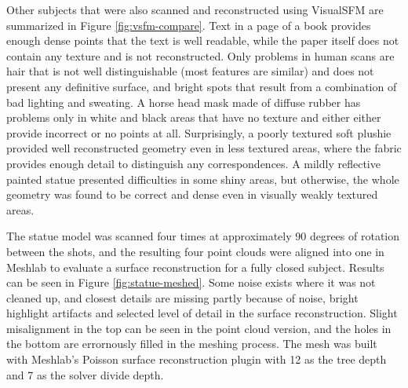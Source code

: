 
Other subjects that were also scanned and reconstructed using VisualSFM are summarized in Figure \ref{fig:vsfm-compare}.
Text in a page of a book provides enough dense points that the text is well readable, while the paper itself does not contain any texture and is not reconstructed.
Only problems in human scans are hair that is not well distinguishable (most features are similar) and does not present any definitive surface, and bright spots that result from a combination of bad lighting and sweating.
A horse head mask made of diffuse rubber has problems only in white and black areas that have no texture and either either provide incorrect or no points at all.
Surprisingly, a poorly textured soft plushie provided well reconstructed geometry even in less textured areas, where the fabric provides enough detail to distinguish any correspondences.
A mildly reflective painted statue presented difficulties in some shiny areas, but otherwise, the whole geometry was found to be correct and dense even in visually weakly textured areas.


The statue model was scanned four times at approximately 90 degrees of rotation between the shots, and the resulting four point clouds were aligned into one in Meshlab to evaluate a surface reconstruction for a fully closed subject.
Results can be seen in Figure \ref{fig:statue-meshed}.
Some noise exists where it was not cleaned up, and closest details are missing partly because of noise, bright highlight artifacts and selected level of detail in the surface reconstruction.
Slight misalignment in the top can be seen in the point cloud version, and the holes in the bottom are errornously filled in the meshing process.
The mesh was built with Meshlab's Poisson surface reconstruction plugin with 12 as the tree depth and  7 as the solver divide depth.

